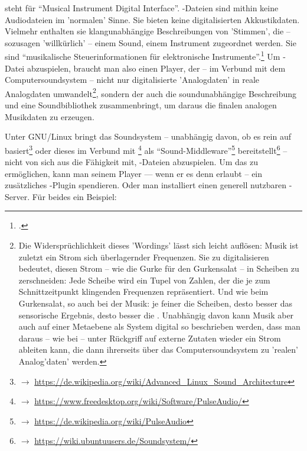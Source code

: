  steht für \enquote{Musical Instrument Digital Interface}.
-Dateien sind mithin keine Audiodateien im 'normalen' Sinne. Sie
bieten keine digitalisierten Akkustikdaten. Vielmehr enthalten sie
klangunabhängige Beschreibungen von 'Stimmen', die -- sozusagen 'willkürlich' --
einem Sound, einem Instrument zugeordnet werden. Sie sind \enquote{musikalische
Steuerinformationen für elektronische Instrumente}.\footcite[vgl. dazu][\nopage
wp]{WpedMidi2019a} Um -Datei abzuspielen, braucht man also einen
Player, der -- im Verbund mit dem Computersoundsystem -- nicht nur
digitalisierte 'Analogdaten' in reale Analogdaten umwandelt\footnote{Die
Widersprüchlichkeit dieses 'Wordings' lässt sich leicht auflösen:
Musik ist zuletzt ein Strom sich überlagernder Frequenzen. Sie zu digitalisieren
bedeutet, diesen Strom -- wie die Gurke für den Gurkensalat -- in Scheiben zu
zerschneiden: Jede Scheibe wird ein Tupel von Zahlen, der die je zum
Schnittzeitpunkt klingenden Frequenzen repräsentiert. Und wie beim Gurkensalat,
so auch bei der Musik: je feiner die Scheiben, desto besser das sensorische
Ergebnis, desto besser die . Unabhängig davon
kann Musik aber auch auf einer Metaebene als System digital so beschrieben
werden, dass man daraus -- wie bei  -- unter Rückgriff auf externe
Zutaten wieder ein Strom  ableiten kann, die
dann ihrerseits über das Computersoundsystem zu 'realen' Analog'daten' werden.},
sondern der auch die soundunabhängige Beschreibung und eine Soundbibliothek
zusammenbringt, um daraus die finalen analogen Musikdaten zu erzeugen.

Unter GNU/Linux bringt das Soundsystem -- unabhängig davon, ob es rein auf
 basiert\footnote{$\rightarrow$
\href{https://de.wikipedia.org/wiki/Advanced{\_}Linux{\_}Sound{\_}Architecture}
{https://de.wikipedia.org/wiki/Advanced{\_}Linux{\_}Sound{\_}Architecture}} oder
dieses im Verbund mit \footnote{$\rightarrow$
\href{https://www.freedesktop.org/wiki/Software/PulseAudio/}
{https://www.freedesktop.org/wiki/Software/PulseAudio/}} als
\enquote{Sound-Middleware}\footnote{$\rightarrow$
\href{https://de.wikipedia.org/wiki/PulseAudio}
{https://de.wikipedia.org/wiki/PulseAudio}} bereitstellt\footnote{$\rightarrow$
\href{https://wiki.ubuntuusers.de/Soundsystem/}{https://wiki.ubuntuusers.de/Soundsystem/}}
-- nicht von sich aus die Fähigkeit mit, -Dateien abzuspielen.
Um das zu ermöglichen, kann man seinem Player --- wenn er es denn erlaubt -- ein
zusätzliches -Plugin spendieren. Oder man installiert einen generell
nutzbaren -Server. Für beides ein Beispiel:

